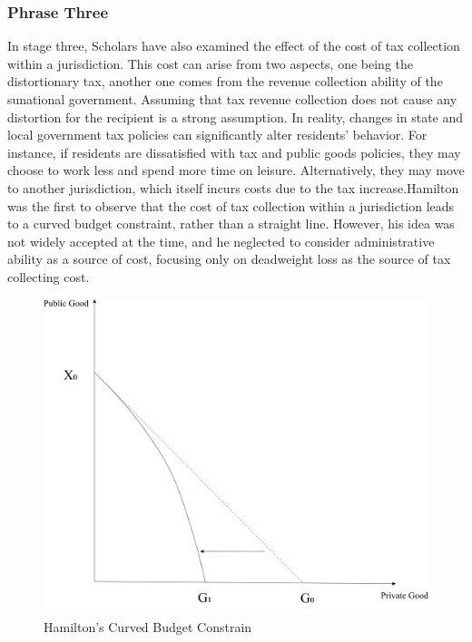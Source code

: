 \subsubsection{Phrase Three}

In stage three, Scholars have also examined the effect of the cost of tax collection within a jurisdiction. This cost can arise from two aspects, one being the distortionary tax, another one comes from the revenue collection ability of the sunational government. Assuming that tax revenue collection does not cause any distortion for the recipient is a strong assumption. In reality, changes in state and local government tax policies can significantly alter residents' behavior. For instance, if residents are dissatisfied with tax and public goods policies, they may choose to work less and spend more time on leisure. Alternatively, they may move to another jurisdiction, which itself incurs costs due to the tax increase.Hamilton \cite{hamilton1986flypaper} was the first to observe that the cost of tax collection within a jurisdiction leads to a curved budget constraint, rather than a straight line. However, his idea was not widely accepted at the time, and he neglected to consider administrative ability as a source of cost, focusing only on deadweight loss as the source of tax collecting cost.

\begin{figure}[H]
    \centering
    \includegraphics[scale=0.4]{Chapter-4/Figures/budget constrain distortion.jpg}
    \caption[Hamilton's Curved Budget Constraint]{Hamilton's Curved Budget Constrain
        \texttt{} }
    \label{Figure 3.4}
\end{figure}

